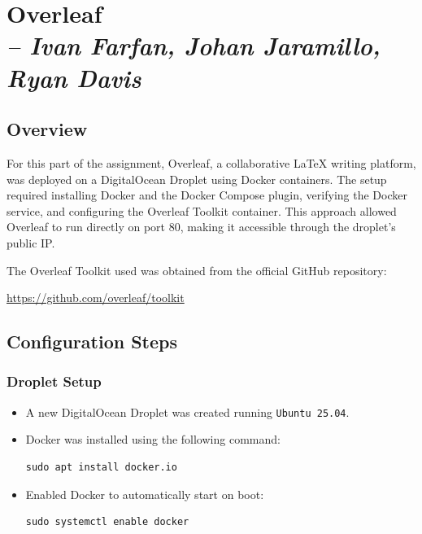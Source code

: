 \chapter{Overleaf \\
\small{\textit{-- Ivan Farfan, Johan Jaramillo, Ryan Davis}}}
\label{Chapter::Overleaf}

\section{Overview}
For this part of the assignment, Overleaf, a collaborative LaTeX writing platform, was deployed on a DigitalOcean Droplet using Docker containers. The setup required installing Docker and the Docker Compose plugin, verifying the Docker service, and configuring the Overleaf Toolkit container. This approach allowed Overleaf to run directly on port 80, making it accessible through the droplet’s public IP.

\noindent
The Overleaf Toolkit used was obtained from the official GitHub repository:

\begin{center}
\url{https://github.com/overleaf/toolkit}
\end{center}

\section{Configuration Steps}
\subsection{Droplet Setup}
\begin{itemize}
    \item A new DigitalOcean Droplet was created running \texttt{Ubuntu 25.04}.
    \item Docker was installed using the following command:
\begin{verbatim}
sudo apt install docker.io
\end{verbatim}

    \item Enabled Docker to automatically start on boot:
\begin{verbatim}
sudo systemctl enable docker
\end{verbatim}
\end{itemize}

